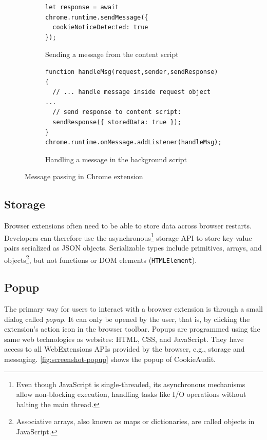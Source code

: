 \begin{figure}
	\centering
	    
	\begin{subfigure}{\textwidth}
		\centering
		\begin{lstlisting}
let response = await chrome.runtime.sendMessage({
  cookieNoticeDetected: true
});
		\end{lstlisting}
		\caption{Sending a message from the content script}
	\end{subfigure}
	    
	\begin{subfigure}{\textwidth}
		\centering
		\begin{lstlisting}
function handleMsg(request,sender,sendResponse) {
  // ... handle message inside request object ...
  // send response to content script:
  sendResponse({ storedData: true });
}
chrome.runtime.onMessage.addListener(handleMsg);
		\end{lstlisting}
		\caption{Handling a message in the background script}
	\end{subfigure}
	    
	\caption{Message passing in Chrome extension}
	\label{fig:message-passing}
\end{figure}

\subsection{Storage} \label{subsec:storage}
Browser extensions often need to be able to store data across browser restarts.
Developers can therefore use the asynchronous\footnote{Even though JavaScript is single-threaded, its asynchronous mechanisms allow non-blocking execution, handling tasks like I/O operations without halting the main thread.} storage API to store key-value pairs serialized as JSON objects. Serializable types include primitives, arrays, and objects\footnote{
Associative arrays, also known as maps or dictionaries, are called objects in JavaScript.
}, but not functions or DOM elements (\texttt{HTMLElement}).

\subsection{Popup}
The primary way for users to interact with a browser extension is through a small dialog called \emph{popup}.
It can only be opened by the user, that is, by clicking the extension’s action icon in the browser toolbar.
Popups are programmed using the same web technologies as websites: HTML, CSS, and JavaScript. 
They have access to all WebExtensions APIs provided by the browser, e.g., storage and messaging. 
\cref{fig:screenshot-popup} shows the popup of CookieAudit.

